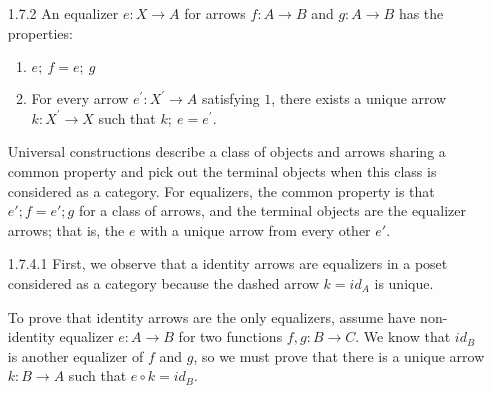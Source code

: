 \documentclass{article}
\begin{document}
\begin{enumerate}
\item[1.7.2]
  An equalizer $e : X \rightarrow A$ for arrows $f: A \rightarrow B$ and $g: A \rightarrow B$ has the properties:

  \begin{enumerate}
  \item $e;\ f = e;\ g$
  \item For every arrow $e^\prime: X^\prime \rightarrow A$ satisfying $1$, there exists a unique arrow $k: X^\prime \rightarrow X$ such that $k;\ e = e^\prime$.
  \end{enumerate}

  Universal constructions describe a class of objects and arrows sharing a common property and pick out the terminal objects when this class is considered as a category.
  For equalizers, the common property is that $e'; f = e'; g$ for a class of arrows, and the terminal objects are the equalizer arrows; that is, the $e$ with a unique arrow from every other $e'$.

\item[]
\item[1.7.4.1]
  First, we observe that a identity arrows are equalizers in a poset considered as a category because the dashed arrow $k = id_A$ is unique.
  \begin{center}
  \end{center}

  To prove that identity arrows are the only equalizers, assume have non-identity equalizer $e : A \rightarrow B$ for two functions $f,g : B \rightarrow C$.
  We know that $id_B$ is another equalizer of $f$ and $g$, so we must prove that there is a unique arrow $k : B \rightarrow A$ such that $e \circ k = id_B$.
  \begin{center}
\end{center}
\end{enumerate}
\end{document}
